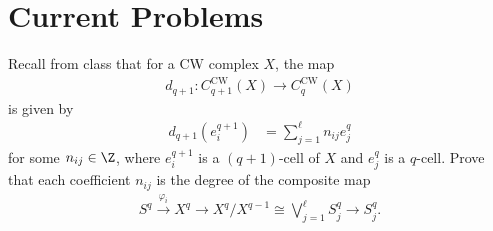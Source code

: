 \documentclass[10pt]{mypackage}
\begin{document}
\section{Current Problems}%
\begin{problem}[Problem 1]
  Recall from class that for a CW complex $X$, the map
  \begin{align*}
    d_{q+1}\colon C_{q+1}^{\operatorname{CW}}\left( X \right)\rightarrow C_{q}^{\operatorname{CW}}\left( X \right)
  \end{align*}
  is given by
  \begin{align*}
    d_{q+1}\left( e_{i}^{q+1} \right)&= \sum_{j=1}^{\ell}n_{ij}e_j^{q}
  \end{align*}
  for some $n_{ij}\in \Z$, where $e_{i}^{q+1}$ is a $\left( q+1 \right)$-cell of $X$ and $e_j^{q}$ is a $q$-cell. Prove that each coefficient $n_{ij}$ is the degree of the composite map
  \begin{align*}
    S^{q}\xrightarrow{\varphi_i}X^q\rightarrow X^q/X^{q-1}\cong \bigvee_{j=1}^{\ell}S_j^{q}\rightarrow S_j^{q}.
  \end{align*}
\end{problem}
\end{document}
